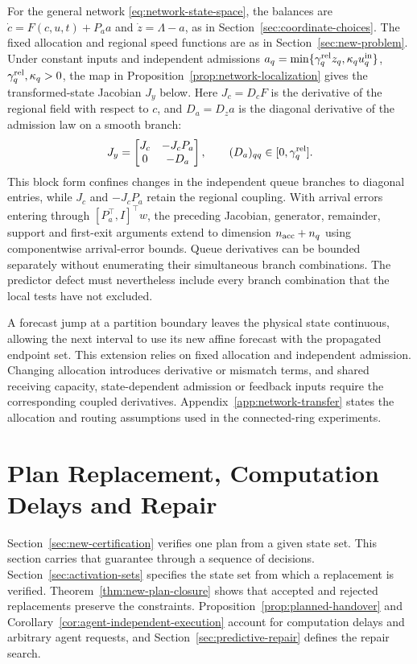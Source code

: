 \documentclass[final]{cas-sc}
\theoremstyle{definition}
\theoremstyle{plain}
\theoremstyle{definition}
\theoremstyle{plain}
\newcommand{\appref}[1]{Appendix~\ref{#1}}
\begin{document}
For the general network \eqref{eq:network-state-space}, the balances
are $\dot c=F(c,u,t)+P_aa$ and $\dot z=\Lambda-a$, as in
Section~\ref{sec:coordinate-choices}. The fixed allocation and regional speed
functions are as in Section~\ref{sec:new-problem}. Under constant inputs
and independent admissions
$a_q=\min\{\gamma_q^{\rm rel}z_q,\kappa_qu_q^{\rm in}\}$,
$\gamma_q^{\rm rel},\kappa_q>0$, the map in
Proposition~\ref{prop:network-localization} gives the transformed-state Jacobian
$J_y$ below. Here $J_c=D_cF$ is the derivative of the regional field
with respect to $c$, and $D_a=D_za$ is the diagonal derivative of the
admission law on a smooth branch:
\begin{equation}
J_y=\begin{bmatrix}J_c&-J_cP_a\\0&-D_a\end{bmatrix},\qquad
(D_a)_{qq}\in[0,\gamma_q^{\rm rel}].
\label{eq:network-jacobian}
\end{equation}
This block form confines changes in the independent queue branches to
diagonal entries, while $J_c$ and $-J_cP_a$ retain the regional
coupling. With arrival errors entering through
$[P_a^\top,I]^\top w$, the preceding Jacobian, generator, remainder,
support and first-exit arguments extend to dimension
$n_{\rm acc}+n_q$ using componentwise arrival-error bounds. Queue
derivatives can be bounded separately without enumerating their
simultaneous branch combinations. The predictor defect must
nevertheless include every branch combination that the local tests
have not excluded.

A forecast jump at a partition boundary leaves the physical state
continuous, allowing the next interval to use its new affine forecast
with the propagated endpoint set. This extension relies on fixed
allocation and independent admission. Changing allocation introduces
derivative or mismatch terms, and shared receiving capacity,
state-dependent admission or feedback inputs require the corresponding
coupled derivatives. \appref{app:network-transfer} states the allocation and
routing assumptions used in the connected-ring experiments.

\section{Plan Replacement, Computation Delays and Repair}
\label{sec:replacement-repair}

Section~\ref{sec:new-certification} verifies one plan from a given state
set. This section carries that guarantee through a sequence of
decisions. Section~\ref{sec:activation-sets} specifies the state set
from which a replacement is verified. Theorem~\ref{thm:new-plan-closure}
shows that accepted and rejected replacements preserve the
constraints. Proposition~\ref{prop:planned-handover} and
Corollary~\ref{cor:agent-independent-execution} account for computation delays and
arbitrary agent requests, and Section~\ref{sec:predictive-repair} defines the
repair search.
\end{document}
